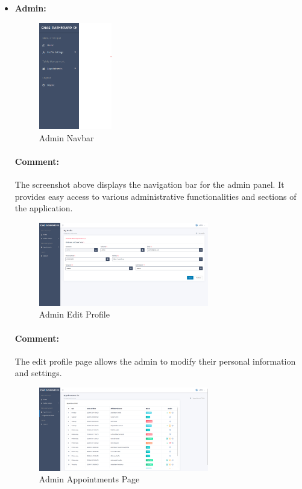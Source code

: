 \begin{itemize}
\item \textbf{Admin:}

  \begin{figure}[htbp]
    \centering
    \includegraphics[width=0.3\textwidth]{SCREENSHOTS/admin/navbar.png}
    \caption{Admin Navbar}
    \label{fig:admin-navbar}
\end{figure}
\paragraph{Comment:} The screenshot above displays the navigation bar for the admin panel. It provides easy access to various administrative functionalities and sections of the application.

\begin{figure}[htbp]
  \centering
  \includegraphics[width=0.7\textwidth]{SCREENSHOTS/admin/edit_profile.png}
  \caption{Admin Edit Profile}
  \label{fig:admin-edit-profile}
\end{figure}
\paragraph{Comment:} The edit profile page allows the admin to modify their personal information and settings.


\begin{figure}[htbp]
    \centering
    \includegraphics[width=0.7\textwidth]{SCREENSHOTS/admin/appointments.png}
    \caption{Admin Appointments Page}
    \label{fig:admin-appointments-page}
\end{figure}

\end{itemize}
